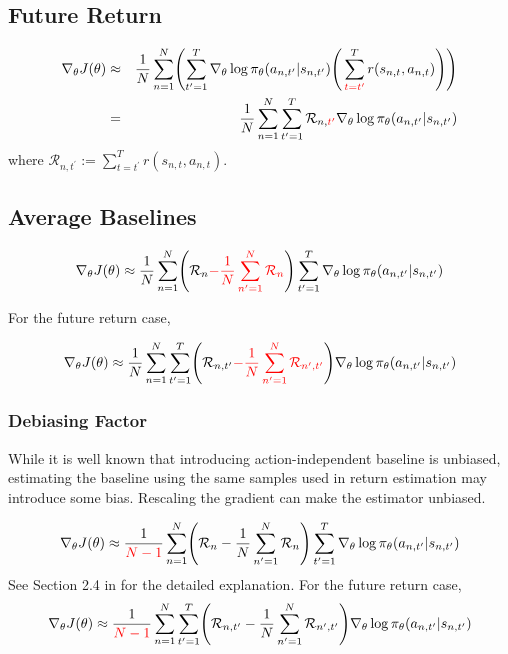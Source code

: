 \documentclass{article}
\begin{document}
\subsection{Future Return}

\begin{eqnarray}
\nabla_\theta J(\theta)
&\approx& \frac{1}{N} \sum_{n=1}^{N} \Biggl( \sum_{t^\prime=1}^{T} \nabla_\theta \log \pi_\theta (a_{n, t^\prime}|s_{n, t^\prime}) \Biggl(\, \sum_{{\color{red}{t=t^\prime}}}^{T} r(s_{n, t}, a_{n, t}) \Biggr) \Biggr)  \\
&=& \frac{1}{N} \sum_{n=1}^{N} \sum_{t^\prime=1}^{T} \mathcal{R}_{n, {\color{red}{t^\prime}}} \nabla_\theta \log \pi_\theta (a_{n, t^\prime}|s_{n, t^\prime})
\end{eqnarray}
where $\mathcal{R}_{n, t^\prime} := \sum_{t=t^\prime}^T r(s_{n, t}, a_{n, t})$.

\subsection{Average Baselines}

\begin{eqnarray}
\nabla_\theta J(\theta)
\approx \frac{1}{N} \sum_{n=1}^{N} \Biggl(\mathcal{R}_n {\color{red}{- \frac{1}{N} \sum_{n^\prime=1}^N \mathcal{R}_n }} \Biggr)\sum_{t^\prime=1}^{T} \nabla_\theta \log \pi_\theta (a_{n, t^\prime}|s_{n, t^\prime})
\end{eqnarray}

For the future return case,

\begin{eqnarray}
\nabla_\theta J(\theta)
\approx \frac{1}{N} \sum_{n=1}^{N} \sum_{t^\prime=1}^{T} \Biggl(\mathcal{R}_{n, t^\prime} {\color{red}{- \frac{1}{N} \sum_{n^\prime=1}^N \mathcal{R}_{n^\prime, t^\prime} }} \Biggr)  \nabla_\theta \log \pi_\theta (a_{n, t^\prime}|s_{n, t^\prime})
\end{eqnarray}

\subsubsection{Debiasing Factor}
While it is well known that introducing action-independent baseline is unbiased,
estimating the baseline using the same samples used in return estimation may introduce some bias.
Rescaling the gradient can make the estimator unbiased.

\begin{eqnarray}
\nabla_\theta J(\theta)
\approx \frac{1}{{\color{red}{N-1}}} \sum_{n=1}^{N} \Biggl(\mathcal{R}_n - \frac{1}{N} \sum_{n^\prime=1}^N \mathcal{R}_n \Biggr)\sum_{t^\prime=1}^{T} \nabla_\theta \log \pi_\theta (a_{n, t^\prime}|s_{n, t^\prime})
\end{eqnarray}
See Section 2.4 in \citet{Parmas2020-tr} for the detailed explanation.
For the future return case,
\begin{eqnarray}
\nabla_\theta J(\theta)
\approx \frac{1}{{\color{red}{N-1}}} \sum_{n=1}^{N} \sum_{t^\prime=1}^{T} \Biggl(\mathcal{R}_{n, t^\prime} - \frac{1}{N} \sum_{n^\prime=1}^N \mathcal{R}_{n^\prime, t^\prime} \Biggr)  \nabla_\theta \log \pi_\theta (a_{n, t^\prime}|s_{n, t^\prime})
\end{eqnarray}
\end{document}
